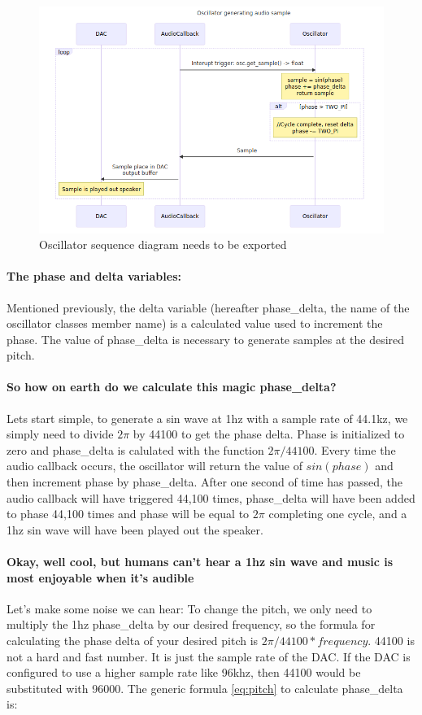 \documentclass[acmlarge,screen]{acmart}
\begin{document}
	\begin{figure}
		\includegraphics[width=\linewidth]{oscillator_sequence_diagram}
		\caption{Oscillator sequence diagram needs to be exported}
		\centering
	\end{figure}
	
	\paragraph{The phase and delta variables:} Mentioned previously, the delta variable (hereafter phase\_delta, the name of the oscillator classes member name) is a calculated value used to increment the phase. The value of phase\_delta is necessary to generate samples at the desired pitch.
	\paragraph{So how on earth do we calculate this magic phase\_delta?} Lets start simple, to generate a sin wave at 1hz with a sample rate of 44.1kz, we simply need to divide \( 2\pi \) by 44100 to get the phase delta. Phase is initialized to zero and phase\_delta is calulated with the function \( 2\pi/44100 \). Every time the audio callback occurs, the oscillator will return the value of \( sin(phase) \) and then increment phase by phase\_delta. After one second of time has passed, the audio callback will have triggered 44,100 times, phase\_delta will have been added to phase 44,100 times and phase will be equal to \( 2\pi \) completing one cycle, and a 1hz sin wave will have been played out the speaker. 
	
	\paragraph{Okay, well cool, but humans can't hear a 1hz sin wave and music is most enjoyable when it's audible} Let's make some noise we can hear: To change the pitch, we only need to multiply the 1hz phase\_delta by our desired frequency, so the formula for calculating the phase delta of your desired pitch is \( 2\pi/44100 * frequency \). 44100 is not a hard and fast number. It is just the sample rate of the DAC. If the DAC is configured to use a higher sample rate like 96khz, then 44100 would be substituted with 96000. The generic formula \eqref{eq:pitch} to calculate phase\_delta is:
	 
\end{document}
